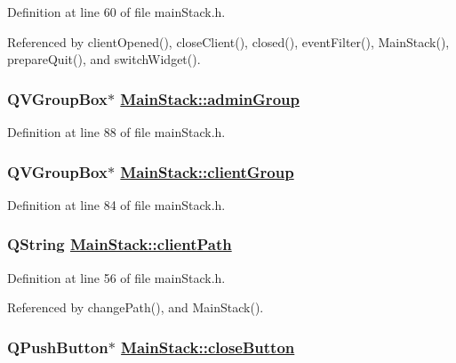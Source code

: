 Definition at line 60 of file main\-Stack.h.

Referenced by client\-Opened(), close\-Client(), closed(), event\-Filter(), Main\-Stack(), prepare\-Quit(), and switch\-Widget().\hypertarget{classMainStack_r29}{
\subsubsection[adminGroup]{\setlength{\rightskip}{0pt plus 5cm}QVGroup\-Box$\ast$ \hyperlink{classMainStack_r29}{Main\-Stack::admin\-Group}}}
\label{classMainStack_r29}


Definition at line 88 of file main\-Stack.h.\hypertarget{classMainStack_r25}{
\subsubsection[clientGroup]{\setlength{\rightskip}{0pt plus 5cm}QVGroup\-Box$\ast$ \hyperlink{classMainStack_r25}{Main\-Stack::client\-Group}}}
\label{classMainStack_r25}


Definition at line 84 of file main\-Stack.h.\hypertarget{classMainStack_r2}{
\subsubsection[clientPath]{\setlength{\rightskip}{0pt plus 5cm}QString \hyperlink{classMainStack_r2}{Main\-Stack::client\-Path}}}
\label{classMainStack_r2}


Definition at line 56 of file main\-Stack.h.

Referenced by change\-Path(), and Main\-Stack().\hypertarget{classMainStack_r22}{
\subsubsection[closeButton]{\setlength{\rightskip}{0pt plus 5cm}QPush\-Button$\ast$ \hyperlink{classMainStack_r22}{Main\-Stack::close\-Button}}}
\label{classMainStack_r22}


